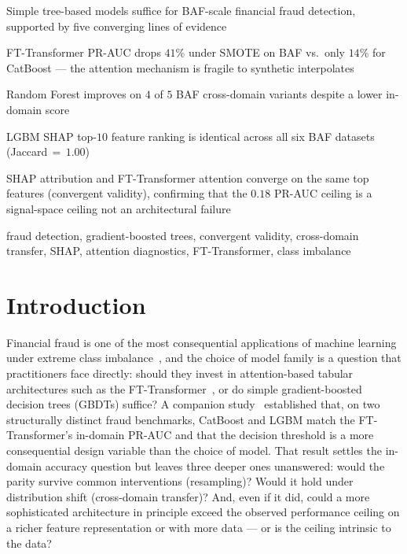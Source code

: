 \documentclass[a4paper,fleqn]{cas-sc}
\begin{document}
\begin{highlights}
\item Simple tree-based models suffice for BAF-scale financial fraud detection, supported by five converging lines of evidence
\item FT-Transformer PR-AUC drops $41\%$ under SMOTE on BAF vs.\ only $14\%$ for CatBoost --- the attention mechanism is fragile to synthetic interpolates
\item Random Forest improves on $4$ of $5$ BAF cross-domain variants despite a lower in-domain score
\item LGBM SHAP top-$10$ feature ranking is identical across all six BAF datasets (Jaccard\,$=\,1.00$)
\item SHAP attribution and FT-Transformer attention converge on the same top features (convergent validity), confirming that the $0.18$ PR-AUC ceiling is a signal-space ceiling not an architectural failure
\end{highlights}

\begin{keywords}
fraud detection\sep
gradient-boosted trees\sep
convergent validity\sep
cross-domain transfer\sep
SHAP\sep
attention diagnostics\sep
FT-Transformer\sep
class imbalance
\end{keywords}

\maketitle


\section{Introduction}
\label{sec:intro}

Financial fraud is one of the most consequential applications of machine
learning under extreme class imbalance~\citep{rymantubb2018survey,hilal2022financial},
and the choice of model family is a question that practitioners face directly:
should they invest in attention-based tabular architectures such as the
FT-Transformer~\citep{gorishniy2021revisiting}, or do simple
gradient-boosted decision trees (GBDTs) suffice?
A companion study~\citep{caixeiro2025threshold} established that, on two
structurally distinct fraud benchmarks, CatBoost and LGBM match the
FT-Transformer's in-domain PR-AUC and that the decision threshold is a more
consequential design variable than the choice of model.
That result settles the in-domain accuracy question but leaves three deeper ones
unanswered: would the parity survive common interventions (resampling)?
Would it hold under distribution shift (cross-domain transfer)?
And, even if it did, could a more sophisticated architecture in principle
exceed the observed performance ceiling on a richer feature representation
or with more data --- or is the ceiling intrinsic to the data?
\end{document}
